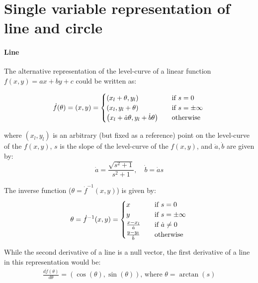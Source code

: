 \section{Single variable representation of line and circle} \label{app:alternativeRep}

\paragraph{Line}
The alternative representation of the level-curve of a linear function $f(x,y)=ax+by+c$ could be written as:

\[
\dot{f}(\theta) = (x,y) =
\begin{cases}
  \left( x_l + \theta, y_l \right) & \quad \text{if } s = 0\\
  \left( x_l, y_l + \theta \right) & \quad \text{if } s = \pm \infty\\
  \left( x_l + \dot{a}\theta , y_l + \dot{b}\theta \right) & \quad \text{otherwise} \\
\end{cases}\\
\]

where $(x_l,y_l)$ is an arbitrary (but fixed as a reference) point on the level-curve of the $f(x,y)$, $s$ is the slope of the level-curve of the $f(x,y)$, and $\dot{a}, \dot{b}$ are given by:
\[
\dot{a} = \frac{\sqrt{ s^2 + 1}}{s^2 + 1}, \quad \dot{b} = \dot{a}s
\]

The inverse function ($\theta = \dot{f}^{-1}(x,y)$) is given by:
\[
\theta = \dot{f}^{-1}(x,y) =
\begin{cases}
  x & \quad \text{if } s = 0\\
  y & \quad \text{if } s = \pm \infty\\
  \frac{x-x_l}{\dot{a}} & \quad \text{if } \dot{a} \neq 0\\
  \frac{y-y_l}{\dot{b}} & \quad \text{otherwise} \\
\end{cases}\\
\]

While the second derivative of a line is a null vector, the first derivative of a line in this representation would be:
\[
\begin{array}{l}
  \frac{d\dot{f}(\theta)}{d\theta} = \left( \cos(\theta) , \sin(\theta) \right) \text{, where } \theta = \arctan(s)\\
\end{array}
\]



